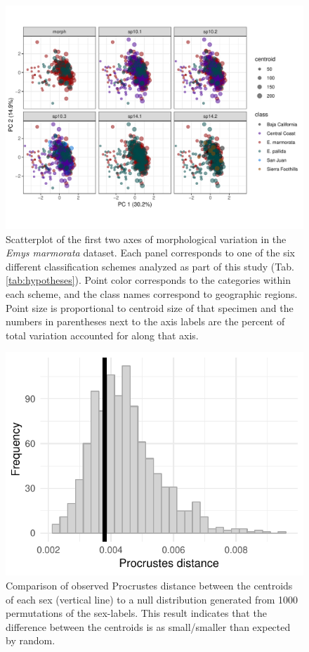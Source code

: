 \documentclass[11pt]{article}
\begin{document}
\begin{figure}[h!]
  \centering
  \includegraphics[height = 0.6\textheight, width = \textwidth, keepaspectratio = true]{figure/emys_pc_graph}
  \caption{Scatterplot of the first two axes of morphological variation in the \textit{Emys marmorata} dataset. Each panel corresponds to one of the six different classification schemes analyzed as part of this study (Tab. \ref{tab:hypotheses}). Point color corresponds to the categories within each scheme, and the class names correspond to geographic regions. Point size is proportional to centroid size of that specimen and the numbers in parentheses next to the axis labels are the percent of total variation accounted for along that axis.}
  \label{fig:emys_pca}
\end{figure}

\begin{figure}[h!]
  \centering
  \includegraphics[height = 0.6\textheight, width = \textwidth, keepaspectratio = true]{figure/sex_test_hist}
  \caption{Comparison of observed Procrustes distance between the centroids of each sex (vertical line) to a null distribution generated from 1000 permutations of the sex-labels. This result indicates that the difference between the centroids is as small/smaller than expected by random.}
  \label{fig:sex_test}
\end{figure}
\end{document}
